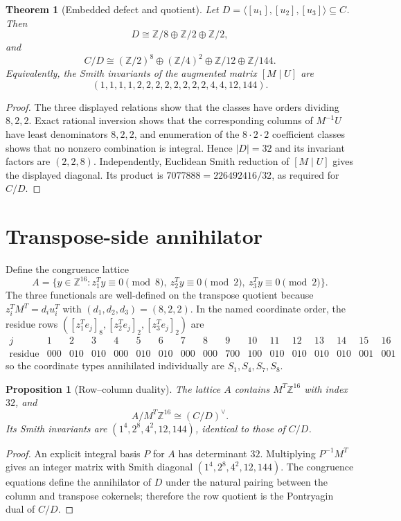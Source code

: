 \documentclass[10pt]{article}
\newtheorem{theorem}{Theorem}
\newtheorem{proposition}{Proposition}
\newcommand{\Z}{\mathbb Z}
\begin{document}
\begin{theorem}[Embedded defect and quotient]
Let $D=\langle [u_1],[u_2],[u_3]\rangle\subseteq C$.  Then
\[
 D\cong \mathbb Z/8\oplus\mathbb Z/2\oplus\mathbb Z/2,
\]
and
\[
 C/D\cong (\mathbb Z/2)^8\oplus(\mathbb Z/4)^2
 \oplus\mathbb Z/12\oplus\mathbb Z/144.
\]
Equivalently, the Smith invariants of the augmented matrix $[M\mid U]$ are
\[
 (1,1,1,1,2,2,2,2,2,2,2,2,4,4,12,144).
\]
\end{theorem}

\begin{proof}
The three displayed relations show that the classes have orders dividing
$8,2,2$.  Exact rational inversion shows that the corresponding columns of
$M^{-1}U$ have least denominators $8,2,2$, and enumeration of the $8\cdot2\cdot2$
coefficient classes shows that no nonzero combination is integral.  Hence
$|D|=32$ and its invariant factors are $(2,2,8)$.  Independently, Euclidean
Smith reduction of $[M\mid U]$ gives the displayed diagonal.  Its product is
$7077888=226492416/32$, as required for $C/D$.
\end{proof}

\section{Transpose-side annihilator}
Define the congruence lattice
\[
 A=\{y\in\Z^{16}:z_1^Ty\equiv0\pmod 8,\ z_2^Ty\equiv0\pmod2,\ z_3^Ty\equiv0\pmod2\}.
\]
The three functionals are well-defined on the transpose quotient because
$z_i^TM^T=d_i u_i^T$ with $(d_1,d_2,d_3)=(8,2,2)$.  In the named coordinate
order, the residue rows $([z_1^Te_j]_8,[z_2^Te_j]_2,[z_3^Te_j]_2)$ are
\[
\begin{array}{c|cccccccccccccccc}
j&1&2&3&4&5&6&7&8&9&10&11&12&13&14&15&16\\\hline
\text{residue}&000&010&010&000&010&010&000&000&700&100&010&010&010&010&001&001
\end{array}
\]
so the coordinate types annihilated individually are $S_1,S_4,S_7,S_8$.

\begin{proposition}[Row--column duality]
The lattice $A$ contains $M^T\Z^{16}$ with index $32$, and
\[
 A/M^T\Z^{16}\cong (C/D)^\vee.
\]
Its Smith invariants are
$(1^4,2^8,4^2,12,144)$, identical to those of $C/D$.
\end{proposition}

\begin{proof}
An explicit integral basis $P$ for $A$ has determinant $32$.  Multiplying
$P^{-1}M^T$ gives an integer matrix with Smith diagonal
$(1^4,2^8,4^2,12,144)$.  The congruence equations define the annihilator of
$D$ under the natural pairing between the column and transpose cokernels;
therefore the row quotient is the Pontryagin dual of $C/D$.
\end{proof}
\end{document}
